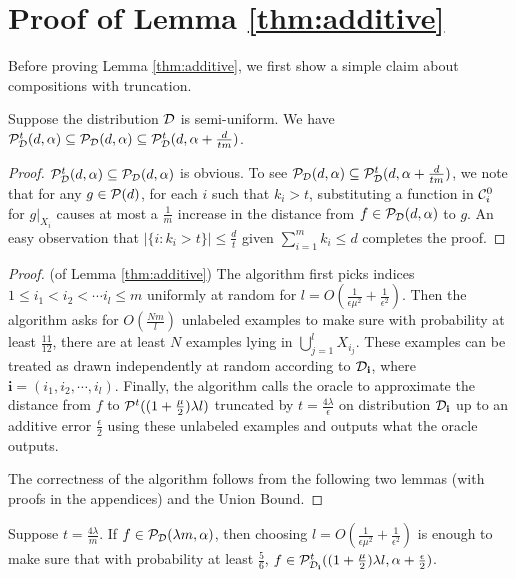 \section{Proof of Lemma \ref{thm:additive}}
\label{sec:compositionproof}
Before proving Lemma \ref{thm:additive}, we first show a simple claim about compositions with truncation.
\begin{claim}
\label{lm:truncation}
Suppose the distribution ${\mathcal{D}}$ is semi-uniform. We have ${\mathcal{P}}_{{\mathcal{D}}}^t(d,\alpha)\subseteq{\mathcal{P}}_{{\mathcal{D}}}(d,\alpha)\subseteq{\mathcal{P}}_{{\mathcal{D}}}^t(d,\alpha+\frac{d}{tm})$.
\end{claim}
\begin{proof}
${\mathcal{P}}_{{\mathcal{D}}}^t(d,\alpha)\subseteq{\mathcal{P}}_{{\mathcal{D}}}(d,\alpha)$ is obvious. To see ${\mathcal{P}}_{{\mathcal{D}}}(d,\alpha)\subseteq{\mathcal{P}}_{{\mathcal{D}}}^t(d,\alpha+\frac{d}{tm})$, we note that for any $g\in{\mathcal{P}}(d)$, for each $i$ such that $k_i>t$, substituting a function in ${\mathcal{C}}_i^0$ for $g|_{X_i}$ causes at most a $\frac{1}{m}$ increase in the distance from $f\in{\mathcal{P}}_{\mathcal{D}}(d,\alpha)$ to $g$. An easy observation that $|\{i:k_i>t\}|\leq\frac{d}{t}$ given $\sum\limits_{i=1}^mk_i\leq d$ completes the proof. 
\end{proof}

\begin{proof}(of Lemma \ref{thm:additive})
The algorithm first picks indices $1\leq i_1<i_2<\cdots i_l\leq m$ uniformly at random for $l=O(\frac{1}{\epsilon\mu^2}+\frac{1}{\epsilon^2})$. Then the algorithm asks for $O(\frac{Nm}{l})$ unlabeled examples to make sure with probability at least $\frac{11}{12}$, there are at least $N$ examples lying in $\bigcup\limits_{j=1}^lX_{i_j}$. These examples can be treated as drawn independently at random according to ${\mathcal{D}}_{\mathbf i}$, where $\mathbf i=(i_1,i_2,\cdots,i_l)$. Finally, the algorithm calls the oracle to approximate the distance from $f$ to ${\mathcal{P}}^{t}((1+\frac{\mu}{2})\lambda l)$ truncated by $t=\frac{4\lambda}{\epsilon}$ on distribution ${\mathcal{D}}_{\mathbf i}$ up to an additive error $\frac{\epsilon}{2}$ using these unlabeled examples and outputs what the oracle outputs. 

The correctness of the algorithm follows from the following two lemmas (with proofs in the appendices) and the Union Bound.
\end{proof}

\begin{lemma}
\label{lm:in}
Suppose $t=\frac{4\lambda}{m}$. If $f\in{\mathcal{P}}_{{\mathcal{D}}}(\lambda m,\alpha)$, then choosing $l=O(\frac{1}{\epsilon\mu^2}+\frac{1}{\epsilon^2})$ is enough to make sure that with probability at least $\frac{5}{6}$, $f\in{\mathcal{P}}^{t}_{{\mathcal{D}}_{\mathbf i}}((1+\frac{\mu}{2})\lambda l,\alpha+\frac{\epsilon}{2})$.
\end{lemma}

